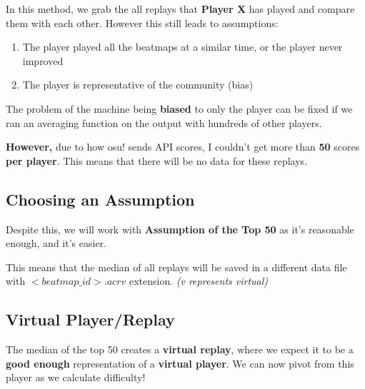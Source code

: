 In this method, we grab the all replays that \textbf{Player X} has played and compare them with each other. However this still leads to assumptions:

\begin{enumerate}
	\item The player played all the beatmaps at a similar time, or the player never improved
	\item The player is representative of the community (bias)
\end{enumerate}

The problem of the machine being \textbf{biased} to only the player can be fixed if we ran an averaging function on the output with hundreds of other players.

\textbf{However,} due to how osu! sends API scores, I couldn't get more than \textbf{50} scores \textbf{per player}. This means that there will be no data for these replays.

\subsection{Choosing an Assumption}

Despite this, we will work with \textbf{Assumption of the Top 50} as it's reasonable enough, and it's easier.

This means that the median of all replays will be saved in a different data file with $<beatmap\_id>.acrv$ extension. \textit{(v represents virtual)}

\subsection{Virtual Player/Replay}

The median of the top 50 creates a \textbf{virtual replay}, where we expect it to be a \textbf{good enough} representation of a \textbf{virtual player}. We can now pivot from this player as we calculate difficulty!



